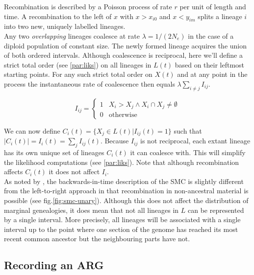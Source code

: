 \documentclass{article}
\begin{document}
Recombination is described by a Poisson process of rate $r$ per unit of length and time. 
A recombination to the 
left of $x$ with $x>x_{i0}$ and $x<y_{im}$ splits a lineage $i$ into two new, uniquely 
labelled lineages. \\ %

Any two \emph{overlapping} lineages coalesce at rate $\lambda = 1/(2N_e)$ in the case
of a diploid population of constant size. The newly formed lineage acquires the 
union of both ordered intervals. %
Although coalescence is reciprocal, here we'll define a strict total order 
(see \ref{par:liks}) on 
all lineages in $L(t)$ based on their leftmost starting points. 
For any such strict total order on $X(t)$ and at any point in the process 
the instantaneous rate of coalescence then equals $\lambda \sum_{i \neq j} I_{ij}$.

\begin{equation} \label{def:coal}
I_{ij} = \begin{cases}
1 & X_i > X_j \wedge X_i \cap X_j \neq \emptyset \\
0 & \text{otherwise}
\end{cases}
\end{equation}

We can now define $C_i(t) = \{X_j \in L(t) | I_{ij}(t) = 1\}$ such that $|C_i(t)| = 
I_{i}(t) = \sum_{j} I_{ij}(t)$.
Because $I_{ij}$ is not reciprocal, each extant lineage has its own unique set of 
lineages $C_i(t)$ it can coalesce with. This will simplify the likelihood computations 
(see \ref{par:liks}). Note that although recombination affects $C_i(t)$ it does not 
affect $I_{i}$.\\ 

As noted by \cite{mcvean_approximating_2005}, the backwards-in-time description of the 
SMC is slightly different from the left-to-right approach in that recombination 
in non-ancestral material is possible (see fig.\ref{fig:smc-unary}). 
Although this does not affect the distribution 
of marginal genealogies, it does mean that not all lineages in $L$ can be represented 
by a single interval. More precisely, all lineages will be associated with 
a single interval up to the point where one section of the 
genome has reached its most recent common ancestor but the neighbouring parts have not.

\subsection{Recording an ARG} \label{par:recording}
\end{document}
